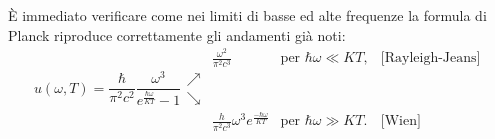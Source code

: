 È immediato verificare come nei limiti di basse ed alte frequenze la formula di Planck riproduce correttamente gli andamenti già noti:\\
\begin{equation}
u(\omega , T) =\frac{\hbar}{\pi ^2 c^2} \frac{\omega ^3}{e^{\frac{\hbar \omega}{KT}} -1} 
\begin{array}{clcc}
 & \displaystyle{\frac{\omega ^2}{\pi ^2 c^3} } & \textrm{per } \hbar \omega \ll KT, & \textrm{[Rayleigh-Jeans]}\\
\nearrow \\
\searrow \\
 & \displaystyle{\frac{h}{\pi ^2 c^3}\omega ^3 e^{\frac{-\hbar \omega}{KT}}} & \textrm{per }  \hbar \omega \gg KT .& \textrm{[Wien]}
\end{array}
\end{equation}

